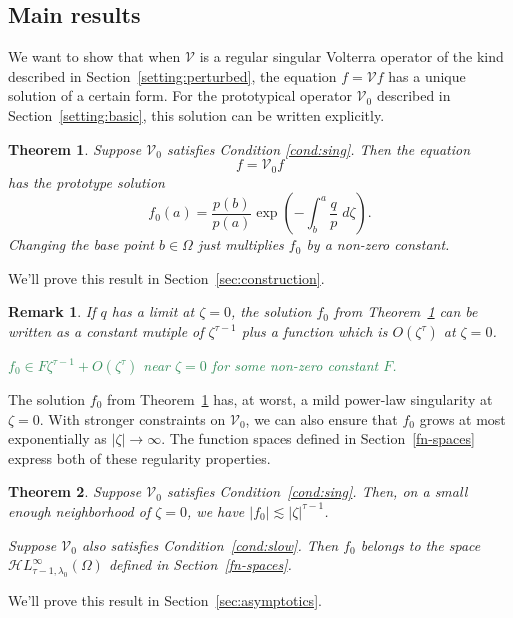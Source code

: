 \documentclass{article}
\theoremstyle{plain}
\newtheorem{thm}{Theorem}
\newtheorem{rmk}{Remark}
\newcommand{\singexp}[2]{\mathcal{H}L^\infty_{#1, #2}}
\newcommand{\volterra}{\mathcal{V}}
\newcommand{\hardpart}{\mathcal{V}_0}
\newcommand{\solproto}{f_0}
\newcommand{\domain}{\Omega}
\begin{document}
\subsection{Main results}\label{sec:results}
We want to show that when $\volterra$ is a regular singular Volterra operator of the kind described in Section~\ref{setting:perturbed}, the equation $f = \volterra f$ has a unique solution of a certain form. For the prototypical operator $\hardpart$ described in Section~\ref{setting:basic}, this solution can be written explicitly.
\begin{thm}\label{thm:basic_volterra}
Suppose $\hardpart$ satisfies {\em Condition \eqref{cond:sing}}. Then the equation
\[ f = \hardpart f \]
has the {\em prototype solution}
\begin{equation}\label{eqn:test_solution}
\solproto(a)=\frac{p(b)}{p(a)} \exp\left(-\int_{b}^{a}\frac{q}{p}\;d\zeta\right).
\end{equation}
Changing the base point $b \in \domain$ just multiplies $f_0$ by a non-zero constant.
\end{thm}
We'll prove this result in Section~\ref{sec:construction}.
\color{RoyalBlue}
\begin{rmk}
If $q$ has a limit at $\zeta = 0$, the solution $f_0$ from Theorem~\ref{thm:basic_volterra} can be written as a constant mutiple of $\zeta^{\tau-1}$ plus a function which is $O(\zeta^\tau)$ at $\zeta = 0$.

\textcolor{SeaGreen}{$f_0 \in F\zeta^{\tau-1} + O(\zeta^\tau)$ near $\zeta = 0$ for some non-zero constant $F$.}
\end{rmk}
\color{black}
The solution $\solproto$ from Theorem~\ref{thm:basic_volterra} has, at worst, a mild power-law singularity at $\zeta = 0$. With stronger constraints on $\hardpart$, we can also ensure that $\solproto$ grows at most exponentially as $|\zeta| \to \infty$. The function spaces defined in Section~\ref{fn-spaces} express both of these regularity properties.
\begin{thm}\label{thm:proto-growth}
Suppose $\hardpart$ satisfies {\em Condition~\eqref{cond:sing}}. Then, on a small enough neighborhood of $\zeta = 0$, we have $|\solproto| \lesssim |\zeta|^{\tau-1}$.

Suppose $\hardpart$ also satisfies {\em Condition~\eqref{cond:slow}}. Then $f_0$ belongs to the space $\singexp{\tau-1}{\lambda_0}(\domain)$ defined in Section~\ref{fn-spaces}.
\end{thm}
We'll prove this result in Section~\ref{sec:asymptotics}.
\end{document}
